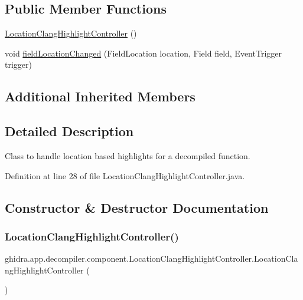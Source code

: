 \subsection*{Public Member Functions}
\begin{DoxyCompactItemize}
\item 
\mbox{\hyperlink{classghidra_1_1app_1_1decompiler_1_1component_1_1_location_clang_highlight_controller_a56cb47020cdd72d7d0cb11997d919060}{Location\+Clang\+Highlight\+Controller}} ()
\item 
void \mbox{\hyperlink{classghidra_1_1app_1_1decompiler_1_1component_1_1_location_clang_highlight_controller_a6be674bef388590defba326704f09365}{field\+Location\+Changed}} (Field\+Location location, Field field, Event\+Trigger trigger)
\end{DoxyCompactItemize}
\subsection*{Additional Inherited Members}


\subsection{Detailed Description}
Class to handle location based highlights for a decompiled function. 

Definition at line 28 of file Location\+Clang\+Highlight\+Controller.\+java.



\subsection{Constructor \& Destructor Documentation}
\mbox{\label{classghidra_1_1app_1_1decompiler_1_1component_1_1_location_clang_highlight_controller_a56cb47020cdd72d7d0cb11997d919060}} 
\subsubsection{\texorpdfstring{LocationClangHighlightController()}{LocationClangHighlightController()}}
{\footnotesize\ttfamily ghidra.\+app.\+decompiler.\+component.\+Location\+Clang\+Highlight\+Controller.\+Location\+Clang\+Highlight\+Controller (\begin{DoxyParamCaption}{ }\end{DoxyParamCaption})\hspace{0.3cm}{\ttfamily [inline]}}



